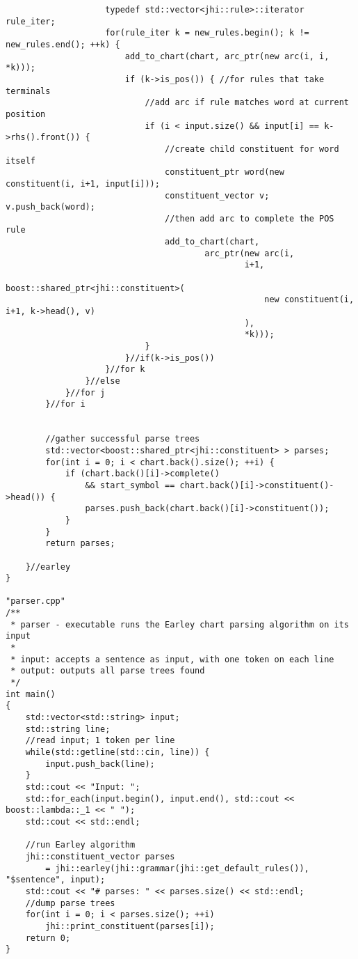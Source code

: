 \documentclass[11pt,a4paper]{jsarticle}
\begin{document}
{\begin{verbatim}
                    typedef std::vector<jhi::rule>::iterator rule_iter;
                    for(rule_iter k = new_rules.begin(); k != new_rules.end(); ++k) {
                        add_to_chart(chart, arc_ptr(new arc(i, i, *k)));
                        if (k->is_pos()) { //for rules that take terminals
                            //add arc if rule matches word at current position
                            if (i < input.size() && input[i] == k->rhs().front()) {
                                //create child constituent for word itself
                                constituent_ptr word(new constituent(i, i+1, input[i]));
                                constituent_vector v; v.push_back(word);
                                //then add arc to complete the POS rule
                                add_to_chart(chart,
                                        arc_ptr(new arc(i,
                                                i+1,
                                                boost::shared_ptr<jhi::constituent>(
                                                    new constituent(i, i+1, k->head(), v)
                                                ),
                                                *k)));
                            }
                        }//if(k->is_pos())
                    }//for k
                }//else
            }//for j
        }//for i


        //gather successful parse trees
        std::vector<boost::shared_ptr<jhi::constituent> > parses;
        for(int i = 0; i < chart.back().size(); ++i) {
            if (chart.back()[i]->complete()
                && start_symbol == chart.back()[i]->constituent()->head()) {
                parses.push_back(chart.back()[i]->constituent());
            }
        }
        return parses;

    }//earley
}

"parser.cpp"
/**
 * parser - executable runs the Earley chart parsing algorithm on its input
 *
 * input: accepts a sentence as input, with one token on each line
 * output: outputs all parse trees found
 */
int main()
{
    std::vector<std::string> input;
    std::string line;
    //read input; 1 token per line
    while(std::getline(std::cin, line)) {
        input.push_back(line);
    }
    std::cout << "Input: ";
    std::for_each(input.begin(), input.end(), std::cout << boost::lambda::_1 << " ");
    std::cout << std::endl;

    //run Earley algorithm
    jhi::constituent_vector parses
        = jhi::earley(jhi::grammar(jhi::get_default_rules()), "$sentence", input);
    std::cout << "# parses: " << parses.size() << std::endl;
    //dump parse trees
    for(int i = 0; i < parses.size(); ++i)
        jhi::print_constituent(parses[i]);
    return 0;
}
\end{verbatim}
}%
\end{document}
